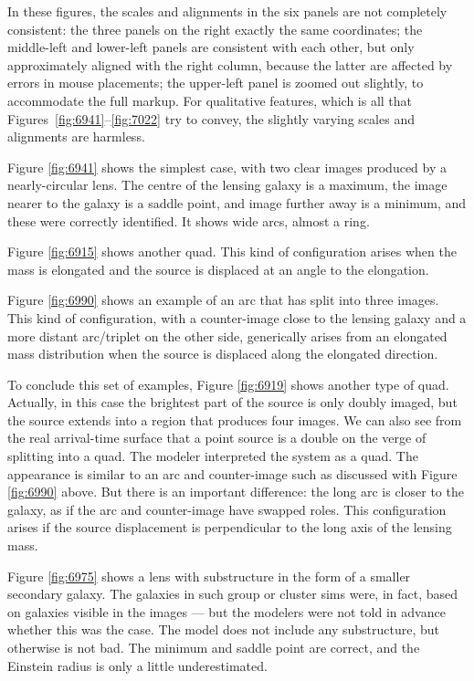 \FloatBarrier


In these figures, the scales and alignments in the six panels are not
completely consistent: the three panels on the right exactly the same
coordinates; the middle-left and lower-left panels are consistent with
each other, but only approximately aligned with the right column,
because the latter are affected by errors in mouse placements; the
upper-left panel is zoomed out slightly, to accommodate the full
markup.  For qualitative features, which is all that
Figures~\ref{fig:6941}--\ref{fig:7022} try to convey, the slightly
varying scales and alignments are harmless.

Figure \ref{fig:6941} shows the simplest case, with two clear images
produced by a nearly-circular lens.  The centre of the lensing galaxy
is a maximum, the image nearer to the galaxy is a saddle point, and
image further away is a minimum, and these were correctly identified.
  It shows wide arcs, almost a ring.

Figure \ref{fig:6915} shows another quad.  This kind of configuration
arises when the mass is elongated and the source is displaced at an
angle to the elongation.

Figure \ref{fig:6990} shows an example of an arc that has split into
three images.  This kind of configuration, with a counter-image close
to the lensing galaxy and a more distant arc/triplet on the other
side, generically arises from an elongated mass distribution when the
source is displaced along the elongated direction.

To conclude this set of examples, Figure \ref{fig:6919} shows another
type of quad.  Actually, in this case the brightest part of the source
is only doubly imaged, but the source extends into a region that
produces four images.  We can also see from the real arrival-time
surface that a point source is a double on the verge of splitting into
a quad.  The modeler interpreted the system as a quad.  The appearance
is similar to an arc and counter-image such as discussed
with Figure \ref{fig:6990} above.  But there is an important
difference: the long arc is closer to the galaxy, as if the arc and
counter-image have swapped roles.  This configuration arises if the
source displacement is perpendicular to the long axis of the lensing
mass.


Figure \ref{fig:6975} shows a lens with substructure in the form of a
smaller secondary galaxy.  The galaxies in such group or cluster sims
were, in fact, based on galaxies visible in the images --- but the
modelers were not told in advance whether this was the case.  The
model does not include any substructure, but otherwise is not bad.
The minimum and saddle point are correct, and the Einstein radius is
only a little underestimated.

